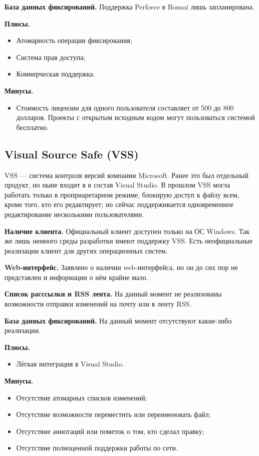 \textbf{База данных фиксирований.} Поддержка Perforce в Bonsai лишь запланирована.

\textbf{Плюсы.}
\begin{itemize}
\item Атомарность операции фиксирования;
\item Система прав доступа;
\item Коммерческая поддержка.
\end{itemize}



\textbf{Минусы.}
\begin{itemize}
\item Стоимость лицензии для одного пользователя составляет от 500 до 800 долларов. Проекты с открытым исходным кодом могут пользоваться системой бесплатно.
\end{itemize}



\subsection{ Visual Source Safe (VSS) } \label{sect2_4_5}

VSS --- система контроля версий компании Microsoft. Ранее это был отдельный продукт, но ныне входит в в состав Visual Studio. В прошлом VSS могла работать только в проприаретарном режиме, блокирую доступ к файлу всем, кроме того, кто его редактирует; но сейчас поддерживается одновременное редактирование несколькими пользователями.

\textbf{Наличие клиента.} Официальный клиент доступен только на ОС Windows. Так же лишь немного среды разработки имеют поддержку VSS. Есть неофициальные реализации клиент для других операционных систем.

\textbf{Web-интерфейс.} Заявлено о наличии web-интерфейса, но он до сих пор не представлен и информации о нём крайне мало.

\textbf{Список расссылки и RSS лента.} На данный момент не реализованы возможности отправки изменений на почту или в ленту RSS.

\textbf{База данных фиксирований.} На данный момент отсутствуют какие-либо реализации.

\textbf{Плюсы.}
\begin{itemize}
\item Лёгкая интеграция в Visual Studio.
\end{itemize}



\textbf{Минусы.}
\begin{itemize}
\item Отсутствие атомарных списков изменений;
\item Отсутствие возможности переместить или переименовать файл;
\item Отсутствие аннотаций или пометок о том, кто сделал правку;
\item Отсутствие полноценной поддержки работы по сети.
\end{itemize}


